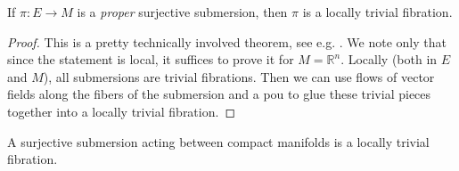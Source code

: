 \documentclass[english,letterpaper]{article}%
\numberwithin{equation}{section}
\numberwithin{figure}{section}
\numberwithin{table}{section}
\theoremstyle{definition}
\theoremstyle{definition}
\theoremstyle{definition}
\theoremstyle{plain}
\theoremstyle{plain}
\theoremstyle{plain}
\theoremstyle{plain}
\theoremstyle{remark}
\theoremstyle{remark}
\begin{document}
\begin{thm}
If $\pi:E\to M$ is a \emph{proper} surjective submersion, then $\pi$ is a locally trivial fibration.
\end{thm}
\begin{proof}
This is a pretty technically involved theorem, see e.g. \cite{Dundas}. We note only that since the statement is local, it suffices to prove it for $M=\mathbb{R}^n$. Locally (both in $E$ and $M$), all submersions are trivial fibrations. Then we can use flows of vector fields along the fibers of the submersion and a \gls{pou} to glue these trivial pieces together into a locally trivial fibration.
\end{proof}
\begin{cor}
A surjective submersion acting between compact manifolds is a locally trivial fibration.
\end{cor}
\end{document}
